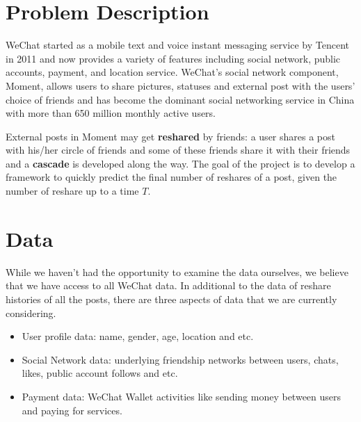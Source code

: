 \documentclass[10pt]{article}
\theoremstyle{plain}
\begin{document}

\section{Problem Description}
WeChat started as a mobile text and voice instant messaging service by Tencent in 2011 and now provides a variety of features including social network, public accounts, payment, and location service. WeChat's social network component, Moment, allows users to share pictures, statuses and external post with the users' choice of friends and has become the dominant social networking service in China with more than 650 million monthly active users.  \par
External posts in Moment may get \textbf{reshared} by friends: a user shares a post with his/her circle of friends and some of these friends share it with their friends and a \textbf{cascade} is developed along the way. The goal of the project is to develop a framework to quickly predict the final number of reshares of a post, given the number of reshare up to a time $T$. 

\section{Data}
While we haven't had the opportunity to examine the data ourselves, we believe that we have access to all WeChat data. In additional to the data of reshare histories of all the posts, there are three aspects of data that we are currently considering. 
\begin{itemize}
	\item User profile data: name, gender, age, location and etc.
	\item Social Network data: underlying friendship networks between users, chats, likes, public account follows and etc.
	\item Payment data: WeChat Wallet activities like sending money between users and paying for services. 
\end{itemize}
\end{document}
